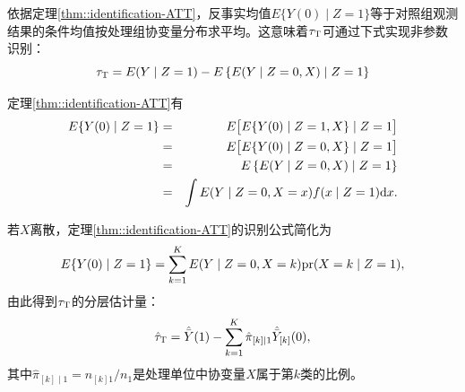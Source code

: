 依据定理\ref{thm::identification-ATT}，反事实均值$ E\{    Y(0) \mid Z=1 \}  $等于对照组观测结果的条件均值按处理组协变量分布求平均。这意味着$\tau_\textsc{T} $可通过下式实现非参数识别：
\begin{equation}
\tau_\textsc{T}  = E(Y\mid Z=1) -E\left\{  E(    Y \mid Z=0 , X) \mid  Z=1  \right\}  \label{eq::att-identification} 
\end{equation}

\begin{myproof}{定理}{\ref{thm::identification-ATT}}有
\begin{eqnarray*}
 E\{    Y(0) \mid Z=1 \} &=&  E\big[   E\{    Y(0) \mid Z=1 , X\} \mid  Z=1  \big] \\
 &=& E\big[   E\{    Y(0) \mid Z=0 , X\} \mid  Z=1  \big] \\
 &=& E\left\{  E(    Y \mid Z=0 , X) \mid  Z=1  \right\} \\
 &=& \int  E(    Y \mid Z=0 , X=x) f(  x \mid Z=1)  \textup{d} x.
\end{eqnarray*}
\end{myproof}


若$X$离散，定理\ref{thm::identification-ATT}的识别公式简化为
$$
 E\{    Y(0) \mid Z=1 \}  = \sum_{k=1}^K E(    Y \mid Z=0 , X=k) \textup{pr}(X=k \mid  Z=1  ),
$$
%
由此得到$\tau_\textsc{T} $的分层估计量：
$$
\hat{\tau}_\textsc{T} =   \hat{\bar{Y}}(1) - \sum_{k=1}^K \hat{\pi}_{[k]\mid 1} \hat{\bar{Y}}_{[k]}(0),
$$
其中$\hat{\pi}_{[k]\mid 1} = n_{[k]1}/n_1$是处理单位中协变量$X$属于第$k$类的比例。 


